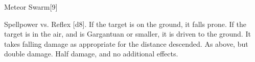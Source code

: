 \begin{spellsection}{Meteor Swarm}[9]
    \begin{spellheader}
    \end{spellheader}
    \begin{spellcontent}
        \begin{spelltargetinginfo}
            \spellrng{\rngmed}
        \end{spelltargetinginfo}
        \begin{spelleffects}
            \begin{spellattack}{Spellpower vs. Reflex}
                \spellsuccess {}[d8].
                If the target is on the ground, it falls prone. If the target is in the air, and is Gargantuan or smaller, it is driven to the ground. It takes falling damage as appropriate for the distance descended.
                \spellcritical As above, but double damage.
                \spellfailure Half damage, and no additional effects.
            \end{spellattack}
        \end{spelleffects}
    \end{spellcontent}
    \begin{spellfooter}
        \spellnotes \firespellnotes
        \miscastyou
    \end{spellfooter}
\end{spellsection}

